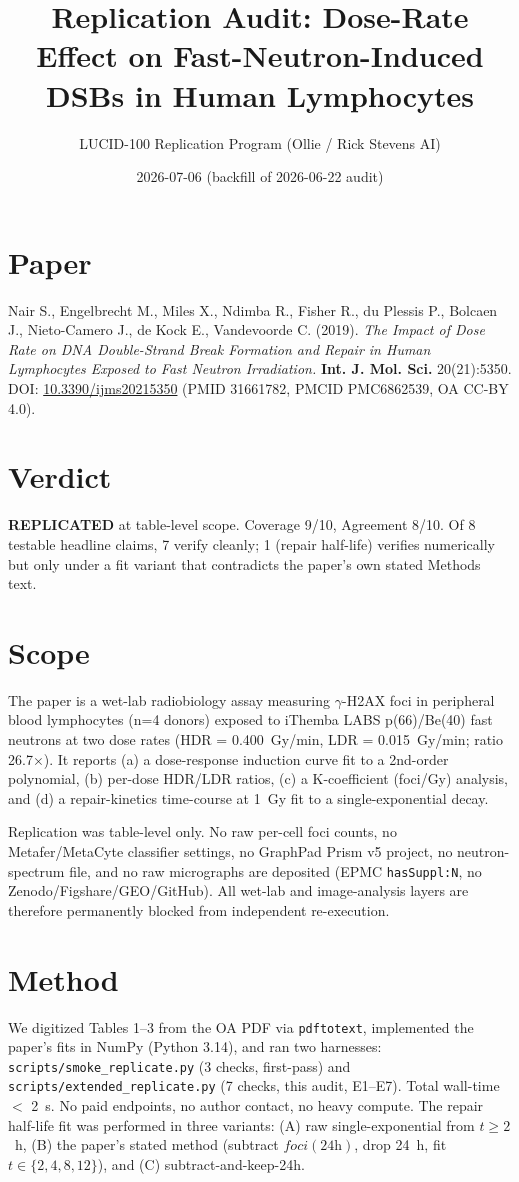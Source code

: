 \documentclass[11pt]{article}
\title{Replication Audit: Dose-Rate Effect on Fast-Neutron-Induced DSBs in Human Lymphocytes}
\author{LUCID-100 Replication Program (Ollie / Rick Stevens AI)}
\date{2026-07-06 (backfill of 2026-06-22 audit)}
\begin{document}
\maketitle

\section*{Paper}
Nair S., Engelbrecht M., Miles X., Ndimba R., Fisher R., du Plessis P., Bolcaen J.,
Nieto-Camero J., de Kock E., Vandevoorde C. (2019).
\emph{The Impact of Dose Rate on DNA Double-Strand Break Formation and Repair in
Human Lymphocytes Exposed to Fast Neutron Irradiation.}
\textbf{Int. J. Mol. Sci.} 20(21):5350.
DOI: \href{https://doi.org/10.3390/ijms20215350}{10.3390/ijms20215350}
(PMID 31661782, PMCID PMC6862539, OA CC-BY 4.0).

\section*{Verdict}
\textbf{REPLICATED} at table-level scope. Coverage 9/10, Agreement 8/10.
Of 8 testable headline claims, 7 verify cleanly; 1 (repair half-life) verifies
numerically but only under a fit variant that contradicts the paper's own stated
Methods text.

\section{Scope}
The paper is a wet-lab radiobiology assay measuring \(\gamma\)-H2AX foci in
peripheral blood lymphocytes (n=4 donors) exposed to iThemba LABS p(66)/Be(40)
fast neutrons at two dose rates (HDR = 0.400~Gy/min, LDR = 0.015~Gy/min;
ratio 26.7$\times$). It reports (a) a dose-response induction curve fit to a
2nd-order polynomial, (b) per-dose HDR/LDR ratios, (c) a K-coefficient
(foci/Gy) analysis, and (d) a repair-kinetics time-course at 1~Gy fit to a
single-exponential decay.

Replication was table-level only. No raw per-cell foci counts, no
Metafer/MetaCyte classifier settings, no GraphPad Prism v5 project, no
neutron-spectrum file, and no raw micrographs are deposited (EPMC
\texttt{hasSuppl:N}, no Zenodo/Figshare/GEO/GitHub). All wet-lab and image-analysis
layers are therefore permanently blocked from independent re-execution.

\section{Method}
We digitized Tables 1--3 from the OA PDF via \texttt{pdftotext}, implemented
the paper's fits in NumPy (Python 3.14), and ran two harnesses:
\texttt{scripts/smoke\_replicate.py} (3 checks, first-pass) and
\texttt{scripts/extended\_replicate.py} (7 checks, this audit, E1--E7). Total
wall-time $<$ 2~s. No paid endpoints, no author contact, no heavy compute.
The repair half-life fit was performed in three variants: (A) raw
single-exponential from $t\!\ge\!2$~h, (B) the paper's stated method
(subtract $foci(24\text{h})$, drop 24~h, fit $t\!\in\!\{2,4,8,12\}$), and (C)
subtract-and-keep-24h.
\end{document}
